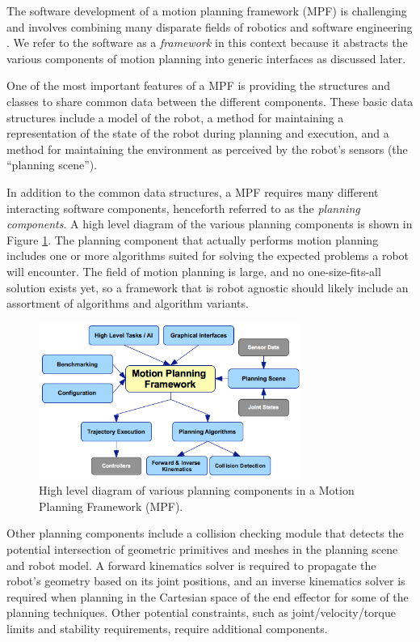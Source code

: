 \documentclass[10pt,journal,compsoc]{joser1}
\begin{document}
{The software development of a motion planning framework (MPF) is challenging and involves combining many disparate fields of robotics and software engineering \cite{perez2010roadmap}. We refer to the software as a \textit{framework} in this context because it abstracts the various components of motion planning into generic interfaces as discussed later.

One of the most important features of a MPF is providing the structures and classes to share common data between the different components. These basic data structures include a model of the robot, a method for maintaining a representation of the state of the robot during planning and execution, and a method for maintaining the environment as perceived by the robot's sensors (the ``planning scene'').

In addition to the common data structures, a MPF requires many different interacting software components, henceforth referred to as the \textit{planning components}. A high level diagram of the various planning components is shown in Figure \ref{fig:motionplanning_highlevel}. The planning component that actually performs motion planning includes one or more algorithms suited for solving the expected problems a robot will encounter. The field of motion planning is large, and no one-size-fits-all solution exists yet, so a framework that is robot agnostic should likely include an assortment of algorithms and algorithm variants.

\begin{figure}[!t]
\centering
\includegraphics[width=3.4in]{coleman_20131110_f05}
\caption{High level diagram of various planning components in a Motion Planning Framework (MPF).}
\label{fig:motionplanning_highlevel}
\end{figure} 

Other planning components include a collision checking module that detects the potential intersection of geometric primitives and meshes in the planning scene and robot model. A forward kinematics solver is required to propagate the robot's geometry based on its joint positions, and an inverse kinematics solver is required when planning in the Cartesian space of the end effector for some of the planning techniques. Other potential constraints, such as joint/velocity/torque limits and stability requirements, require additional components.

}
\end{document}
